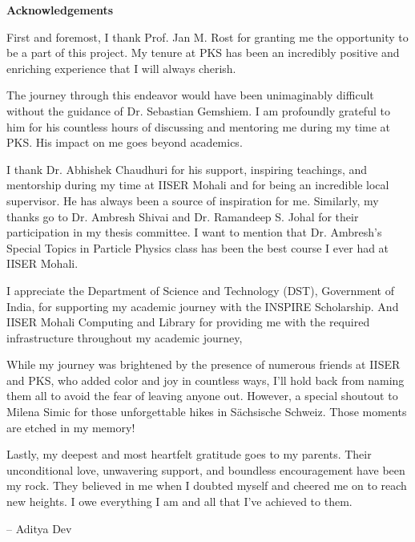 \begin{center}
    {\Large\bfseries\sffamily  Acknowledgements}
\end{center}
    
First and foremost, I thank Prof. Jan M. Rost for granting me the opportunity to be a part of this project. My tenure at PKS has been an incredibly positive and enriching experience that I will always cherish. 

The journey through this endeavor would have been unimaginably difficult without the guidance of Dr. Sebastian Gemshiem. I am profoundly grateful to him for his countless hours of discussing and mentoring me during my time at PKS. His impact on me goes beyond academics.

I thank Dr. Abhishek Chaudhuri for his support, inspiring teachings, and mentorship during my time at IISER Mohali and for being an incredible local supervisor. He has always been a source of inspiration for me. Similarly, my thanks go to Dr. Ambresh Shivai and Dr. Ramandeep S. Johal for their participation in my thesis committee. I want to mention that Dr. Ambresh's Special Topics in Particle Physics class has been the best course I ever had at IISER Mohali. 

I appreciate the Department of Science and Technology (DST), Government of India, for supporting my academic journey with the INSPIRE Scholarship. And IISER Mohali Computing and Library for providing me with the required infrastructure throughout my academic journey, 



While my journey was brightened by the presence of numerous friends at IISER and PKS, who added color and joy in countless ways, I'll hold back from naming them all to avoid the fear of leaving anyone out. However, a special shoutout to Milena Simic for those unforgettable hikes in Sächsische Schweiz. Those moments are etched in my memory!


Lastly, my deepest and most heartfelt gratitude goes to my parents. Their unconditional love, unwavering support, and boundless encouragement have been my rock. They believed in me when I doubted myself and cheered me on to reach new heights. I owe everything I am and all that I've achieved to them.

\vfill 

\hfill -- Aditya Dev

\newpage